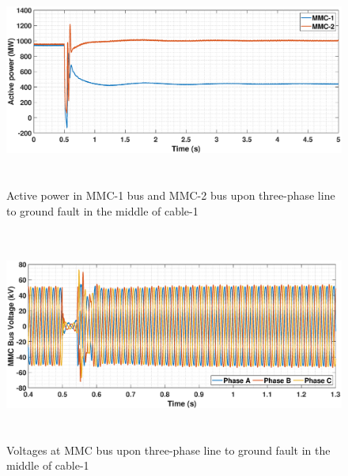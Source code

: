 \begin{figure}[H]
    \includegraphics[height = 7cm,width = \textwidth]{Diagrams/Chapter_5/P_MMC_1_2_3phaseSC.eps}
    \caption{Active power in MMC-1 bus and MMC-2 bus upon three-phase line to ground fault in the middle of cable-1}
    \label{17_3phaseSC}
\end{figure}

\begin{figure}[H]
    \includegraphics[height = 7cm,width = \textwidth]{Diagrams/Chapter_5/VABC_MMC_1_3phaseSC.eps}
    \caption{Voltages at MMC bus upon three-phase line to ground fault in the middle of cable-1}
    \label{VABC_MMC_1_3phaseSC}
\end{figure}



